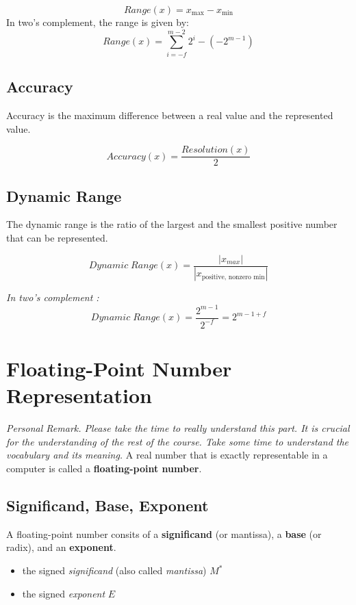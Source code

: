 \documentclass[12pt,openany, tikz,border=10pt]{book}
\begin{document}
			      	\[Range(x) = x_{\text{max}} - x_{\text{min}}\]
			      	\newblock
			      	\newline
			      	In two's complement, the range is given by:
			      	\[ Range(x) = \displaystyle\sum_{i=-f}^{m-2} 2^i - \left( -2^{m-1} \right)\]
			      	
			      	\subsection{Accuracy}
			      	Accuracy is the maximum difference between a real value and the represented value.
			      	
			      	$$Accuracy(x) = \frac{Resolution(x)}{2}$$
			      	
			      	\subsection{Dynamic Range}
			      	The dynamic range is the ratio of the largest and the smallest positive number that can be represented.
			      	
			      	$$Dynamic \; Range(x) = \frac{|x_{max}|}{|x_{\text{positive, nonzero min}}|}$$
			      	
			      	\textit{In two's complement :}
			      	$$Dynamic \; Range(x) = \frac{2^{m-1}}{2^{-f}} = 2^{m-1+f}$$
			      	
			      	\section{Floating-Point Number Representation}
			      	\textit{Personal Remark. Please take the time to really understand this part. It is crucial for the understanding of the rest of the course. Take some time to understand the vocabulary and its meaning.}\newline
			      	\vskip 0.5cm
			      	A real number that is exactly representable in a computer is called a \textbf{floating-point number}. 
			      	\subsection{Significand, Base, Exponent}
			      	A floating-point number consits of a \textbf{significand} (or mantissa), a \textbf{base} (or radix), and an \textbf{exponent}.
			      	\begin{itemize}
			      		\item[] the signed \textit{significand} (also called \textit{mantissa}) \( M^* \)
			      		\item[] the signed \textit{exponent} \( E \)
			      	\end{itemize}
			      	
\end{document}
